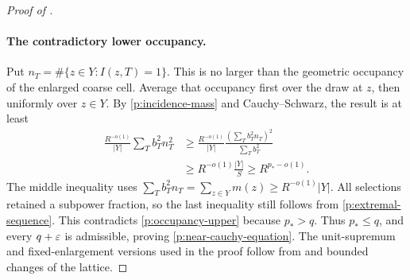 \begin{proof}[Proof of ]
\paragraph{The contradictory lower occupancy.}
Put $n_T=\#\{z\in Y:I(z,T)=1\}$.  This is no larger than the geometric
occupancy of the enlarged coarse cell.  Average that occupancy first over
the draw at $z$, then uniformly over $z\in Y$.  By
\eqref{p:incidence-mass} and Cauchy--Schwarz, the result is at least
\begin{align*}
 \frac{R^{-o(1)}}{|Y|}\sum_Tb_T^2n_T^2
 &\geq\frac{R^{-o(1)}}{|Y|}
       \frac{(\sum_Tb_T^2n_T)^2}{\sum_Tb_T^2}\\
 &\geq R^{-o(1)}\frac{|Y|}{S}
 \geq R^{p_*-o(1)}.
\end{align*}
The middle inequality uses
$\sum_Tb_T^2n_T=\sum_{z\in Y}m(z)\geq R^{-o(1)}|Y|$.
All selections retained a subpower fraction, so the last inequality still
follows from \eqref{p:extremal-sequence}.  This contradicts
\eqref{p:occupancy-upper} because $p_*>q$.  Thus $p_*\leq q$, and every
$q+\varepsilon$ is admissible, proving \eqref{p:near-cauchy-equation}.
The unit-supremum and fixed-enlargement versions used in the proof follow
from  and bounded changes of the lattice.
\end{proof}
